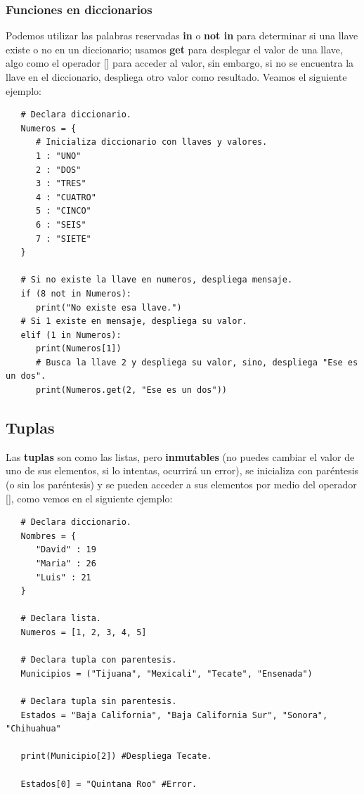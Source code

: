 \subsubsection{Funciones en diccionarios}
\hspace{0.55cm}Podemos utilizar las palabras reservadas \textbf{in} o \textbf{not in} para determinar si una llave existe o no en un diccionario; usamos \textbf{get} para desplegar el valor de una llave, algo como el operador [] para acceder al valor, sin embargo, si no se encuentra la llave en el diccionario, despliega otro valor como resultado. Veamos el siguiente ejemplo:
\begin{lstlisting}
   # Declara diccionario.
   Numeros = {
      # Inicializa diccionario con llaves y valores.
      1 : "UNO"
      2 : "DOS"
      3 : "TRES"
      4 : "CUATRO"
      5 : "CINCO"
      6 : "SEIS"
      7 : "SIETE"
   }
   
   # Si no existe la llave en numeros, despliega mensaje.
   if (8 not in Numeros):
      print("No existe esa llave.")
   # Si 1 existe en mensaje, despliega su valor.
   elif (1 in Numeros):
      print(Numeros[1])
      # Busca la llave 2 y despliega su valor, sino, despliega "Ese es un dos".
      print(Numeros.get(2, "Ese es un dos"))
\end{lstlisting}


\subsection{Tuplas}
\hspace{0.55cm}Las \textbf{tuplas} son como las listas, pero \textbf{inmutables} (no puedes cambiar el valor de uno de sus elementos, si lo intentas, ocurrirá un error), se inicializa con paréntesis (o sin los paréntesis) y se pueden acceder a sus elementos por medio del operador [], como vemos en el siguiente ejemplo:
\begin{lstlisting}
   # Declara diccionario.
   Nombres = {
      "David" : 19
      "Maria" : 26
      "Luis" : 21
   }
   
   # Declara lista.
   Numeros = [1, 2, 3, 4, 5]
   
   # Declara tupla con parentesis.
   Municipios = ("Tijuana", "Mexicali", "Tecate", "Ensenada")
   
   # Declara tupla sin parentesis.
   Estados = "Baja California", "Baja California Sur", "Sonora", "Chihuahua"
   
   print(Municipio[2]) #Despliega Tecate.
   
   Estados[0] = "Quintana Roo" #Error.
\end{lstlisting}

